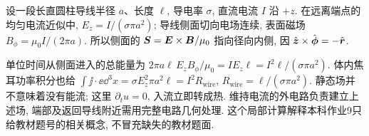 设一段长直圆柱导线半径 $a$、长度 $\ell$, 导电率 $\sigma$, 直流电流 $I$ 沿 $+z$. 在远离端点的均匀电流近似中, $E_z=I/(\sigma\pi a^2)$; 导线侧面切向电场连续, 表面磁场 $B_\phi=\mu_0I/(2\pi a)$. 所以侧面的 $\boldsymbol{S}=\boldsymbol{E}\times\boldsymbol{B}/\mu_0$ 指向径向内侧, 因 $\hat{\boldsymbol{z}}\times\hat{\boldsymbol{\phi}}=-\hat{\boldsymbol{r}}$.

单位时间从侧面进入的总能量为
$2\pi a\ell\,E_zB_\phi/\mu_0=I E_z\ell=I^2\ell/(\sigma\pi a^2)$.
体内焦耳功率积分也给
$\int\jj\cdot\ee\dd^3x=\sigma E_z^2\pi a^2\ell=I^2R_\mathrm{wire}$,
$R_\mathrm{wire}=\ell/(\sigma\pi a^2)$. 静态场并不意味着没有能流; 这里 $\partial_tu=0$, 入流立即转成热. 维持电流的外电路负责建立上述场, 端部及返回导线附近需用完整电路几何处理. 这个局部计算解释本科作业9只给教材题号的相关概念, 不冒充缺失的教材题面.
